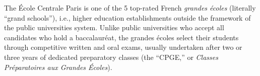 \documentclass[11pt,a4paper]{moderncv}
\begin{document}



\flushleft
\footnotemark[1] \small{The \'{E}cole Centrale Paris is one of the 5 top-rated French \textit{grandes écoles} (literally ``grand schools''), i.e., higher education establishments outside the framework of the public universities system. Unlike public universities who accept all candidates who hold a baccalauréat, the grandes écoles select their students through competitive written and oral exams, usually undertaken after two or three years of dedicated preparatory classes (the ``CPGE,'' or \textit{Classes Préparatoires aux Grandes Écoles})}.

%
\end{document}
